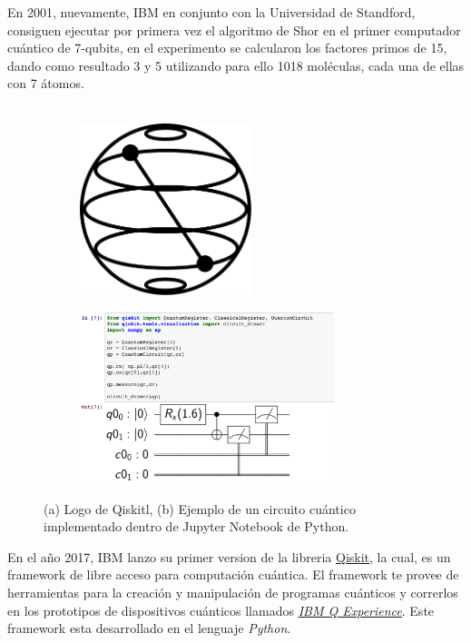  En 2001, nuevamente, IBM en conjunto con la Universidad de 
Standford, consiguen ejecutar por primera vez el algoritmo de Shor en el primer computador cuántico de 7-qubits, en el experimento se calcularon los factores primos de 15, dando como resultado 3 y 5 utilizando para ello 1018 moléculas, cada una de ellas con 7 átomos.\\\\
\begin{figure}[H]
    \begin{subfigure}{0.5\textwidth}
        \centering
        \caption{}
    \includegraphics[height=5cm]{images/Qiskit.png}
    \label{fig:logo_qiskit}
    \end{subfigure}
    \begin{subfigure}{0.5\textwidth}
        \centering
        \caption{}
    \includegraphics[height=5cm]{images/Example_qiskit.png}
    \label{fig:example_qiskit}
    \end{subfigure}
    \caption{(a) Logo de Qiskitl, (b) Ejemplo de un circuito cuántico implementado dentro de Jupyter Notebook de Python.}
\end{figure}
En el año 2017, IBM lanzo su primer version de la libreria \href{https://qiskit.org/}{Qiskit}, la cual, es un framework de libre acceso para computación cuántica. El framework te provee de herramientas para la creación y manipulación de programas cuánticos
y correrlos en los prototipos de dispositivos cuánticos llamados \href{https://quantum-computing.ibm.com/}{\textit{IBM Q Experience}}. Este framework esta desarrollado en el lenguaje \textit{Python}. 